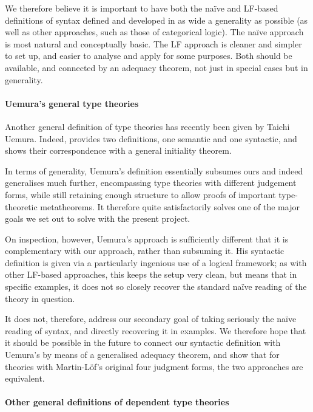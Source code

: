 We therefore believe it is important to have both the naïve and LF-based definitions of syntax defined and developed in as wide a generality as possible (as well as other approaches, such as those of categorical logic).
%
The naïve approach is most natural and conceptually basic.
%
The LF approach is cleaner and simpler to set up, and easier to analyse and apply for some purposes.
%
Both should be available, and connected by an adequacy theorem, not just in special cases but in generality.


\paragraph*{Uemura’s general type theories}

Another general definition of type theories has recently been given by Taichi Uemura.
%
Indeed, \citep{uemura19:_gener_framew_seman_type_theor} provides two definitions, one semantic and one syntactic, and shows their correspondence with a general initiality theorem.

In terms of generality, Uemura’s definition essentially subsumes ours and indeed generalises much further, encompassing type theories with different judgement forms, while still retaining enough structure to allow proofs of important type-theoretic meta\-theorems.
%
It therefore quite satisfactorily solves one of the major goals we set out to solve with the present project.

On inspection, however, Uemura’s approach is sufficiently different that it is complementary with our approach, rather than subsuming it.
%
His syntactic definition is given via a particularly ingenious use of a logical framework; as with other LF-based approaches, this keeps the setup very clean, but means that in specific examples, it does not so closely recover the standard naïve reading of the theory in question.

It does not, therefore, address our secondary goal of taking seriously the naïve reading of syntax, and directly recovering it in examples.
%
We therefore hope that it should be possible in the future to connect our syntactic definition with Uemura’s by means of a generalised adequacy theorem, and show that for theories with Martin-Löf’s original four judgment forms, the two approaches are equivalent.


\paragraph*{Other general definitions of dependent type theories}
\label{sec:other-related-work}

